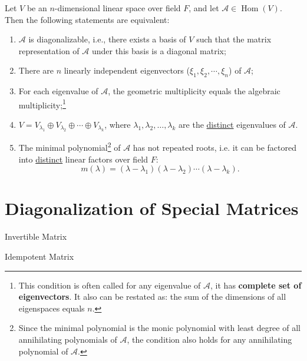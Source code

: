 \documentclass[11pt]{../../TexTemplate/elegantbook} %
\begin{document}
\begin{theorem}
    Let \( V \) be an \( n \)-dimensional linear space over field \( F \),
    and let \( \mathcal{A}\in \operatorname{Hom}(V) \).
    Then the following statements are equivalent:
    \begin{enumerate}
        \item \( \mathcal{A} \) is diagonalizable, i.e., there exists a basis of \( V \)
            such that the matrix representation of \( \mathcal{A} \) under this basis is a diagonal matrix;
        \item There are \( n \) linearly independent eigenvectors (\( \xi_{1}, \xi_{2}, \cdots, \xi_{n} \)) of \( \mathcal{A} \);
        \item For each eigenvalue of \( \mathcal{A} \), the geometric multiplicity equals the algebraic multiplicity;\footnote{
            This condition is often called for any eigenvalue of \( \mathcal{A} \), 
            it has \textbf{complete set of eigenvectors}.
            It also can be restated as: 
            the sum of the dimensions of all eigenspaces equals \( n \).
        }
        \item \( V = V_{\lambda_1} \oplus V_{\lambda_2} \oplus \cdots \oplus V_{\lambda_k} \),
            where \( \lambda_1, \lambda_2, \dots, \lambda_k \) are the \underline{distinct} eigenvalues of \( \mathcal{A} \).
        \item The minimal polynomial\footnote{
            Since the minimal polynomial is the monic polynomial with least degree 
            of all annihilating polynomials of \( \mathcal{A} \),
            the condition also holds for any annihilating polynomial of \( \mathcal{A} \).
        } of \( \mathcal{A} \) has not repeated roots, 
            i.e. it can be factored into \underline{distinct} linear factors over field \( F \):
            \[
            m(\lambda) = (\lambda - \lambda_1)(\lambda - \lambda_2) \cdots (\lambda - \lambda_k).
            \]
    \end{enumerate}
\end{theorem}

\section{Diagonalization of Special Matrices}
\begin{leftbarTitle}{Invertible Matrix}\end{leftbarTitle}

\begin{leftbarTitle}{Idempotent Matrix}\end{leftbarTitle}
\end{document}
